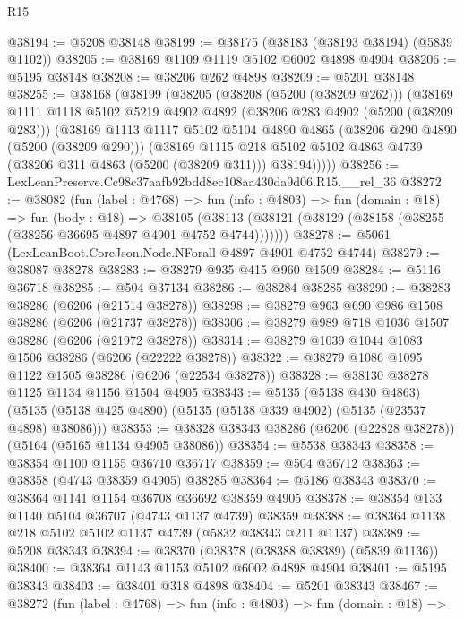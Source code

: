 \begin{lexlean}{R15}
\begin{coremodule}
{{{{{{{{{{{@38194 := @5208 @38148
@38199 := @38175 (@38183 (@38193 @38194) (@5839 @1102))
@38205 := @38169 @1109 @1119 @5102 @6002 @4898 @4904
@38206 := @5195 @38148
@38208 := @38206 @262 @4898
@38209 := @5201 @38148
@38255 := @38168
    (@38199
      (@38205
        (@38208 (@5200 (@38209 @262)))
        (@38169
          @1111
          @1118
          @5102
          @5219
          @4902
          @4892
          (@38206 @283 @4902 (@5200 (@38209 @283)))
          (@38169
            @1113
            @1117
            @5102
            @5104
            @4890
            @4865
            (@38206 @290 @4890 (@5200 (@38209 @290)))
            (@38169
              @1115
              @218
              @5102
              @5102
              @4863
              @4739
              (@38206 @311 @4863 (@5200 (@38209 @311)))
              @38194)))))
@38256 := LexLeanPreserve.Cc98c37aafb92bdd8ec108aa430da9d06.R15.__rel_36
@38272 := @38082
    (fun (label : @4768) =>
    fun (info : @4803) =>
    fun (domain : @18) =>
    fun (body : @18) =>
    @38105 (@38113 (@38121 (@38129 (@38158 (@38255 (@38256 @36695 @4897 @4901 @4752 @4744)))))))
@38278 := @5061 (LexLeanBoot.CoreJson.Node.NForall @4897 @4901 @4752 @4744)
@38279 := @38087 @38278
@38283 := @38279 @935 @415 @960 @1509
@38284 := @5116 @36718
@38285 := @504 @37134
@38286 := @38284 @38285
@38290 := @38283 @38286 (@6206 (@21514 @38278))
@38298 := @38279 @963 @690 @986 @1508 @38286 (@6206 (@21737 @38278))
@38306 := @38279 @989 @718 @1036 @1507 @38286 (@6206 (@21972 @38278))
@38314 := @38279 @1039 @1044 @1083 @1506 @38286 (@6206 (@22222 @38278))
@38322 := @38279 @1086 @1095 @1122 @1505 @38286 (@6206 (@22534 @38278))
@38328 := @38130 @38278 @1125 @1134 @1156 @1504 @4905
@38343 := @5135
    (@5138 @430 @4863)
    (@5135 (@5138 @425 @4890) (@5135 (@5138 @339 @4902) (@5135 (@23537 @4898) @38086)))
@38353 := @38328 @38343 @38286 (@6206 (@22828 @38278)) (@5164 (@5165 @1134 @4905 @38086))
@38354 := @5538 @38343
@38358 := @38354 @1100 @1155 @36710 @36717
@38359 := @504 @36712
@38363 := @38358 (@4743 @38359 @4905) @38285
@38364 := @5186 @38343
@38370 := @38364 @1141 @1154 @36708 @36692 @38359 @4905
@38378 := @38354 @133 @1140 @5104 @36707 (@4743 @1137 @4739) @38359
@38388 := @38364 @1138 @218 @5102 @5102 @1137 @4739 (@5832 @38343 @211 @1137)
@38389 := @5208 @38343
@38394 := @38370 (@38378 (@38388 @38389) (@5839 @1136))
@38400 := @38364 @1143 @1153 @5102 @6002 @4898 @4904
@38401 := @5195 @38343
@38403 := @38401 @318 @4898
@38404 := @5201 @38343
@38467 := @38272
    (fun (label : @4768) =>
    fun (info : @4803) =>
    fun (domain : @18) =>
}}}}}}}}}}}
\end{coremodule}
\end{lexlean}
